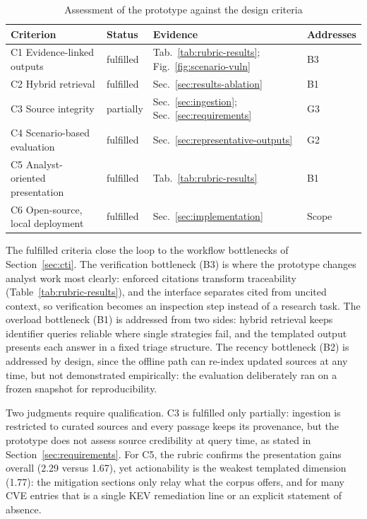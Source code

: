 \begin{table}[H]
    \centering
    \small
    \begin{tabular}{p{}lp{}l}
        \toprule
        \textbf{Criterion} & \textbf{Status} & \textbf{Evidence} & \textbf{Addresses} \\
        \midrule
        C1 Evidence-linked outputs & fulfilled &
            Tab.~\ref{tab:rubric-results};
            Fig.~\ref{fig:scenario-vuln} & B3 \\
        C2 Hybrid retrieval & fulfilled &
            Sec.~\ref{sec:results-ablation} & B1 \\
        C3 Source integrity & partially &
            Sec.~\ref{sec:ingestion}; Sec.~\ref{sec:requirements} & G3 \\
        C4 Scenario-based evaluation & fulfilled &
            Sec.~\ref{sec:representative-outputs} & G2 \\
        C5 Analyst-oriented presentation & fulfilled &
            Tab.~\ref{tab:rubric-results} & B1 \\
        C6 Open-source, local deployment & fulfilled &
            Sec.~\ref{sec:implementation} & Scope \\
        \bottomrule
    \end{tabular}
    \caption{Assessment of the prototype against the design criteria}
    \label{tab:assessment}
\end{table}

The fulfilled criteria close the loop to the workflow bottlenecks of
Section~\ref{sec:cti}. The verification bottleneck (B3) is where the
prototype changes analyst work most clearly: enforced citations
transform traceability (Table~\ref{tab:rubric-results}), and the
interface separates cited from uncited context, so verification
becomes an inspection step instead of a research task. The overload bottleneck (B1) is addressed
from two sides: hybrid retrieval keeps identifier queries reliable where
single strategies fail, and the templated output presents each answer in
a fixed triage structure. The recency bottleneck (B2) is addressed by
design, since the offline path can re-index updated sources at any
time, but not demonstrated empirically: the evaluation deliberately
ran on a frozen snapshot for reproducibility.

Two judgments require qualification. C3 is fulfilled only
partially: ingestion is restricted to curated sources and every passage
keeps its provenance, but the prototype does not assess source
credibility at query time, as stated in Section~\ref{sec:requirements}.
For C5, the rubric confirms the presentation gains overall (2.29 versus
1.67), yet actionability is the weakest templated dimension (1.77): the
mitigation sections only relay what the corpus offers, and for many CVE
entries that is a single KEV remediation line or an explicit statement
of absence.

